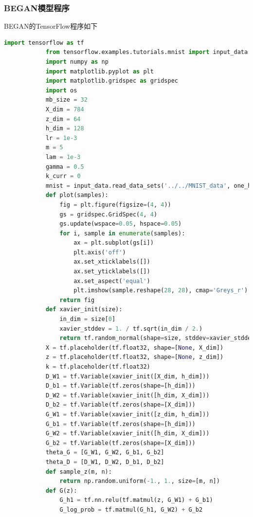         \subsubsection{BEGAN模型程序}
            \par
            BEGAN的TensorFlow程序如下
            \begin{lstlisting}[language = Python]
            import tensorflow as tf
            from tensorflow.examples.tutorials.mnist import input_data
            import numpy as np
            import matplotlib.pyplot as plt
            import matplotlib.gridspec as gridspec
            import os
            mb_size = 32
            X_dim = 784
            z_dim = 64
            h_dim = 128
            lr = 1e-3
            m = 5
            lam = 1e-3
            gamma = 0.5
            k_curr = 0
            mnist = input_data.read_data_sets('../../MNIST_data', one_hot=True)
            def plot(samples):
                fig = plt.figure(figsize=(4, 4))
                gs = gridspec.GridSpec(4, 4)
                gs.update(wspace=0.05, hspace=0.05)
                for i, sample in enumerate(samples):
                    ax = plt.subplot(gs[i])
                    plt.axis('off')
                    ax.set_xticklabels([])
                    ax.set_yticklabels([])
                    ax.set_aspect('equal')
                    plt.imshow(sample.reshape(28, 28), cmap='Greys_r')
                return fig
            def xavier_init(size):
                in_dim = size[0]
                xavier_stddev = 1. / tf.sqrt(in_dim / 2.)
                return tf.random_normal(shape=size, stddev=xavier_stddev)
            X = tf.placeholder(tf.float32, shape=[None, X_dim])
            z = tf.placeholder(tf.float32, shape=[None, z_dim])
            k = tf.placeholder(tf.float32)
            D_W1 = tf.Variable(xavier_init([X_dim, h_dim]))
            D_b1 = tf.Variable(tf.zeros(shape=[h_dim]))
            D_W2 = tf.Variable(xavier_init([h_dim, X_dim]))
            D_b2 = tf.Variable(tf.zeros(shape=[X_dim]))
            G_W1 = tf.Variable(xavier_init([z_dim, h_dim]))
            G_b1 = tf.Variable(tf.zeros(shape=[h_dim]))
            G_W2 = tf.Variable(xavier_init([h_dim, X_dim]))
            G_b2 = tf.Variable(tf.zeros(shape=[X_dim]))
            theta_G = [G_W1, G_W2, G_b1, G_b2]
            theta_D = [D_W1, D_W2, D_b1, D_b2]
            def sample_z(m, n):
                return np.random.uniform(-1., 1., size=[m, n])
            def G(z):
                G_h1 = tf.nn.relu(tf.matmul(z, G_W1) + G_b1)
                G_log_prob = tf.matmul(G_h1, G_W2) + G_b2

\end{lstlisting}
